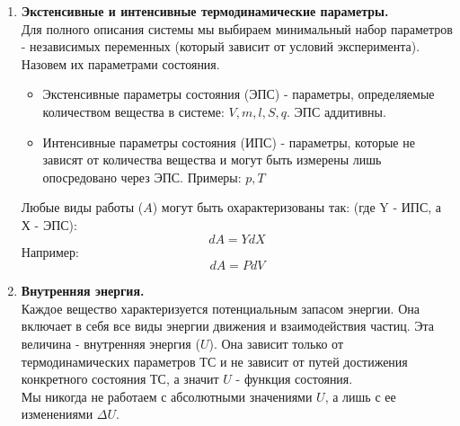 \documentclass[14pt,a4paper]{scrartcl}
\begin{document}
\begin{enumerate}[label=\arabic*)]
		\item \textbf{Экстенсивные и интенсивные термодинамические параметры.} \\
		Для полного описания системы мы выбираем минимальный набор параметров - независимых переменных (который зависит от условий эксперимента). Назовем их параметрами состояния.
		\begin{itemize}
			\item Экстенсивные параметры состояния (ЭПС) - параметры, определяемые количеством вещества в системе: $ V, m, l, S, q  $. ЭПС аддитивны.
			\item Интенсивные параметры состояния (ИПС) - параметры, которые не зависят от количества вещества и могут быть измерены лишь опосредовано через ЭПС. Примеры: $p, T $
		\end{itemize}
		Любые виды работы ($A$) могут быть охарактеризованы так: (где Y - ИПС, а Х - ЭПС):
		$$ dA = Y dX  $$ 
		Например:
		$$ dA = P dV  $$
		\item \textbf{Внутренняя энергия.} \\
		Каждое вещество характеризуется потенциальным запасом энергии. Она включает в себя все виды энергии движения и взаимодействия частиц. Эта величина - внутренняя энергия ($U$). Она зависит только от термодинамических параметров ТС и не зависит от путей достижения конкретного состояния ТС, а значит $U$ - функция состояния. \\
		Мы никогда не работаем с абсолютными значениями $U$, а лишь с ее изменениями $\Delta{U}$.
		
	\end{enumerate}	
\end{document}
